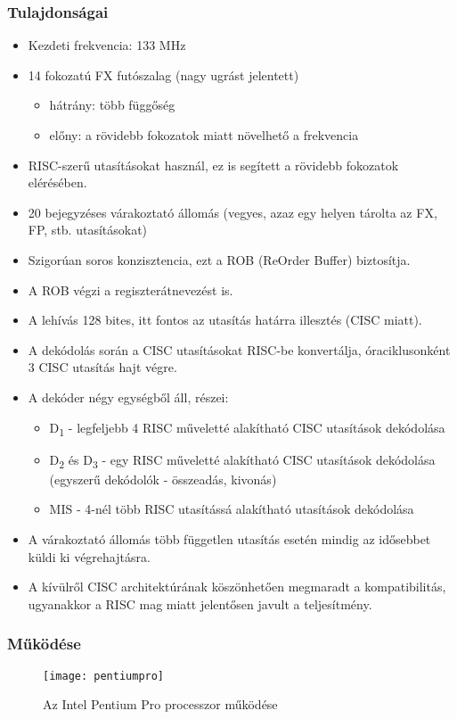 \subsubsection{Tulajdonságai}
\begin{itemize}
    \item Kezdeti frekvencia: 133 MHz
    \item 14 fokozatú FX futószalag (nagy ugrást jelentett)
    \begin{itemize}
        \item hátrány: több függőség
        \item előny: a rövidebb fokozatok miatt növelhető a frekvencia
    \end{itemize}
    \item RISC-szerű utasításokat használ, ez is segített a rövidebb fokozatok elérésében.
    \item 20 bejegyzéses várakoztató állomás (vegyes, azaz egy helyen tárolta az FX, FP, stb. utasításokat)
    \item Szigorúan soros konzisztencia, ezt a ROB (ReOrder Buffer) biztosítja.
    \item A ROB végzi a regiszterátnevezést is.
    \item A lehívás 128 bites, itt fontos az utasítás határra illesztés (CISC miatt).
    \item A dekódolás során a CISC utasításokat RISC-be konvertálja, óraciklusonként 3 CISC utasítás hajt végre.
    \item A dekóder négy egységből áll, részei:
    \begin{itemize}
        \item D\textsubscript{1} - legfeljebb 4 RISC műveletté alakítható CISC utasítások dekódolása
        \item D\textsubscript{2} és D\textsubscript{3} - egy RISC műveletté alakítható CISC utasítások dekódolása (egyszerű dekódolók - összeadás, kivonás)
        \item MIS - 4-nél több RISC utasítássá alakítható utasítások dekódolása
    \end{itemize}
    \item A várakoztató állomás több független utasítás esetén mindig az idősebbet küldi ki végrehajtásra.
    \item A kívülről CISC architektúrának köszönhetően megmaradt a kompatibilitás, ugyanakkor a RISC mag miatt jelentősen javult a teljesítmény.
\end{itemize}

\subsubsection{Működése}
\begin{figure}[h]
    \texttt{[image: pentiumpro]}
    \centering
    \caption{Az Intel Pentium Pro processzor működése}
    \label{fig:pentiumpro}
\end{figure}

